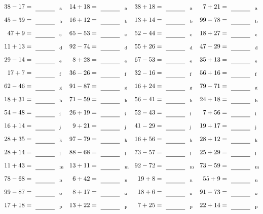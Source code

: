 \documentclass
[
  draft    = true,
  fontsize = 11pt,
  parskip  = half-
]
{scrartcl}
\begin{document}
\clearpage
\begin{align*}
    \pline{38-17}&=\rline{a}
  & \pline{14+18}&=\rline{a}
  & \pline{38+18}&=\rline{a}
  & \pline{7+21}&=\rline{a} \\[1ex]
    \pline{45-39}&=\rline{b}
  & \pline{16+12}&=\rline{b}
  & \pline{13+14}&=\rline{b}
  & \pline{99-78}&=\rline{b} \\[1ex]
    \pline{47+9}&=\rline{c}
  & \pline{65-53}&=\rline{c}
  & \pline{52-44}&=\rline{c}
  & \pline{18+27}&=\rline{c} \\[1ex]
    \pline{11+13}&=\rline{d}
  & \pline{92-74}&=\rline{d}
  & \pline{55+26}&=\rline{d}
  & \pline{47-29}&=\rline{d} \\[1ex]
    \pline{29-14}&=\rline{e}
  & \pline{8+28}&=\rline{e}
  & \pline{67-53}&=\rline{e}
  & \pline{35+13}&=\rline{e} \\[1ex]
    \pline{17+7}&=\rline{f}
  & \pline{36-26}&=\rline{f}
  & \pline{32-16}&=\rline{f}
  & \pline{56+16}&=\rline{f} \\[1ex]
    \pline{62-46}&=\rline{g}
  & \pline{91-87}&=\rline{g}
  & \pline{16+24}&=\rline{g}
  & \pline{79-71}&=\rline{g} \\[1ex]
    \pline{18+31}&=\rline{h}
  & \pline{71-59}&=\rline{h}
  & \pline{56-41}&=\rline{h}
  & \pline{24+18}&=\rline{h} \\[1ex]
    \pline{54-48}&=\rline{i}
  & \pline{26+19}&=\rline{i}
  & \pline{52-43}&=\rline{i}
  & \pline{7+56}&=\rline{i} \\[1ex]
    \pline{16+14}&=\rline{j}
  & \pline{9+21}&=\rline{j}
  & \pline{41-29}&=\rline{j}
  & \pline{19+17}&=\rline{j} \\[1ex]
    \pline{28+35}&=\rline{k}
  & \pline{97-79}&=\rline{k}
  & \pline{16+56}&=\rline{k}
  & \pline{28+12}&=\rline{k} \\[1ex]
    \pline{28+14}&=\rline{l}
  & \pline{88-68}&=\rline{l}
  & \pline{73-57}&=\rline{l}
  & \pline{25+29}&=\rline{l} \\[1ex]
    \pline{11+43}&=\rline{m}
  & \pline{13+11}&=\rline{m}
  & \pline{92-72}&=\rline{m}
  & \pline{73-59}&=\rline{m} \\[1ex]
    \pline{78-68}&=\rline{n}
  & \pline{6+42}&=\rline{n}
  & \pline{19+8}&=\rline{n}
  & \pline{55+9}&=\rline{n} \\[1ex]
    \pline{99-87}&=\rline{o}
  & \pline{8+17}&=\rline{o}
  & \pline{18+6}&=\rline{o}
  & \pline{91-73}&=\rline{o} \\[1ex]
    \pline{17+18}&=\rline{p}
  & \pline{13+22}&=\rline{p}
  & \pline{7+25}&=\rline{p}
  & \pline{22+14}&=\rline{p}
\end{align*}
\end{document}
